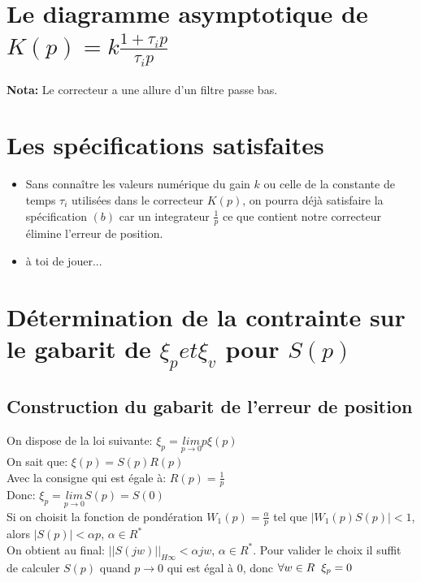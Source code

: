 \documentclass[12pt, a4paper, openany]{report}
\begin{document}
 \section{Le diagramme asymptotique de $K(p)= k \frac {1+\tau_{i}p}{\tau_{i}p}$} 
 
  \begin{center}
    \label{fig3}
  \end{center}

  \textbf{Nota:} \hspace{2mm} Le correcteur a une allure d'un filtre passe bas.

 \section{Les spécifications satisfaites}
 
  \begin{itemize} [label=,font=\small \color{black}]
  	\item Sans connaître les valeurs numérique du gain $k$ ou celle de la constante de temps $\tau_{i}$ utilisées dans le correcteur $K(p)$, on pourra déjà satisfaire la spécification $(b)$ car un integrateur $\frac{1}{p}$ ce que contient notre correcteur élimine l'erreur de position.
    \item à toi de jouer...
  \end{itemize}
 
 \section{Détermination de la contrainte sur le gabarit de $\xi_{p} et \xi_{v} $ pour $S(p)$}  
 
  \subsection{Construction du gabarit de l'erreur de position}
  
   On dispose de la loi suivante: \hspace{5mm} $\xi_{p}=\underset{p\longrightarrow 0}{lim}  p\xi(p)$\\[0.75cm]
   On sait que: \hspace{5mm} $\xi(p)=S(p)R(p)$\\[0.75cm]
   Avec la consigne qui est égale à: \hspace{5mm} $R(p)=\frac{1}{p}$\\[0.75cm]
   Donc: \hspace{5mm} $\xi_{p}=\underset{p\longrightarrow 0}{lim} S(p)=S(0)$\\[0.75cm]
   Si on choisit la fonction de pondération $W_{1}(p)=\frac{\alpha}{p}$ tel que $|W_{1}(p)S(p)|<1$, alors $|S(p)|<\alpha p$, $\alpha \in R^{*}$ \\[0.75cm]
   On obtient au final: \hspace{5mm} $||S(jw)||_{H\infty}<\alpha jw$, $\alpha \in R^{*}$. Pour valider le choix il suffit de calculer $S(p)$ quand $p\rightarrow0$ qui est égal à $0$, donc $\forall w \in R \hspace{2mm} \xi_{p}=0$ 
   
\end{document}
